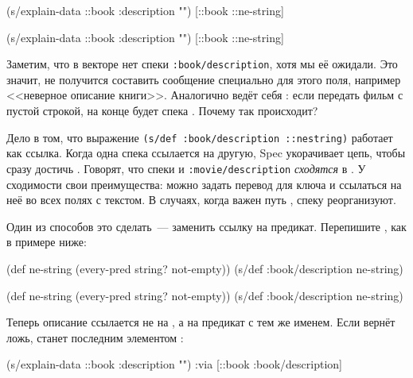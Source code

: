 \ifnarrow


\begin{clojure}
(s/explain-data ::book
  {:description ""})
[::book ::ne-string]
\end{clojure}


\else


\begin{clojure}
(s/explain-data ::book {:description ""})
[::book ::ne-string]
\end{clojure}


\fi

Заметим, что в векторе нет спеки \texttt{:book/de\-scription}, хотя мы её
ожидали. Это значит, не получится составить сообщение специально для этого поля,
например <<неверное описание книги>>. Аналогично ведёт себя : если
передать фильм с пустой строкой, на конце  будет спека
. Почему так происходит?

Дело в том, что выражение \texttt{(s/def :book/de\-scrip\-tion ::ne\-string)}
работает как ссылка. Когда одна спека ссылается на другую, Spec укорачивает
цепь, чтобы сразу достичь . Говорят, что спеки
 и \texttt{:movie/\-de\-scrip\-tion} \emph{сходятся} в
. У сходимости свои преимущества: можно задать перевод для
ключа  и ссылаться на неё во всех полях с текстом. В случаях,
когда важен путь , спеку реорганизуют.

Один из способов это сделать~--- заменить ссылку на предикат. Перепишите
, как в примере ниже:

\ifnarrow


\begin{clojure}
(def ne-string
  (every-pred string? not-empty))
(s/def :book/description ne-string)
\end{clojure}


\else


\begin{clojure}
(def ne-string (every-pred string? not-empty))
(s/def :book/description ne-string)
\end{clojure}


\fi

Теперь описание ссылается не на , а на предикат с тем же
именем. Если  вернёт ложь,  станет
последним элементом :

\ifnarrow


\begin{clojure}
(s/explain-data ::book
  {:description ""})
{:via [::book :book/description]}
\end{clojure}


